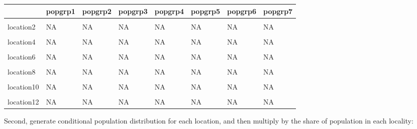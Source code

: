 \documentclass[
]{book}
\begin{document}
\begin{table}[!h]
\centering
\begin{tabular}{l|l|l|l|l|l|l|l}
\hline
  & popgrp1 & popgrp2 & popgrp3 & popgrp4 & popgrp5 & popgrp6 & popgrp7\\
\hline
\cellcolor{gray!6}{location1} & \cellcolor{gray!6}{NA} & \cellcolor{gray!6}{NA} & \cellcolor{gray!6}{NA} & \cellcolor{gray!6}{NA} & \cellcolor{gray!6}{NA} & \cellcolor{gray!6}{NA} & \cellcolor{gray!6}{NA}\\
\hline
location2 & NA & NA & NA & NA & NA & NA & NA\\
\hline
\cellcolor{gray!6}{location3} & \cellcolor{gray!6}{NA} & \cellcolor{gray!6}{NA} & \cellcolor{gray!6}{NA} & \cellcolor{gray!6}{NA} & \cellcolor{gray!6}{NA} & \cellcolor{gray!6}{NA} & \cellcolor{gray!6}{NA}\\
\hline
location4 & NA & NA & NA & NA & NA & NA & NA\\
\hline
\cellcolor{gray!6}{location5} & \cellcolor{gray!6}{NA} & \cellcolor{gray!6}{NA} & \cellcolor{gray!6}{NA} & \cellcolor{gray!6}{NA} & \cellcolor{gray!6}{NA} & \cellcolor{gray!6}{NA} & \cellcolor{gray!6}{NA}\\
\hline
location6 & NA & NA & NA & NA & NA & NA & NA\\
\hline
\cellcolor{gray!6}{location7} & \cellcolor{gray!6}{NA} & \cellcolor{gray!6}{NA} & \cellcolor{gray!6}{NA} & \cellcolor{gray!6}{NA} & \cellcolor{gray!6}{NA} & \cellcolor{gray!6}{NA} & \cellcolor{gray!6}{NA}\\
\hline
location8 & NA & NA & NA & NA & NA & NA & NA\\
\hline
\cellcolor{gray!6}{location9} & \cellcolor{gray!6}{NA} & \cellcolor{gray!6}{NA} & \cellcolor{gray!6}{NA} & \cellcolor{gray!6}{NA} & \cellcolor{gray!6}{NA} & \cellcolor{gray!6}{NA} & \cellcolor{gray!6}{NA}\\
\hline
location10 & NA & NA & NA & NA & NA & NA & NA\\
\hline
\cellcolor{gray!6}{location11} & \cellcolor{gray!6}{NA} & \cellcolor{gray!6}{NA} & \cellcolor{gray!6}{NA} & \cellcolor{gray!6}{NA} & \cellcolor{gray!6}{NA} & \cellcolor{gray!6}{NA} & \cellcolor{gray!6}{NA}\\
\hline
location12 & NA & NA & NA & NA & NA & NA & NA\\
\hline
\end{tabular}
\end{table}

Second, generate conditional population distribution for each location, and then multiply by the share of population in each locality:
\end{document}

